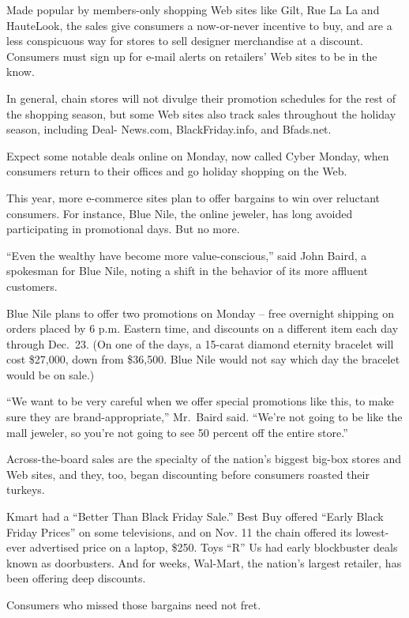 ﻿\documentclass[12pt]{article}
\begin{document}
Made popular by members-only shopping Web sites like Gilt, Rue La La and HauteLook, the sales give
consumers a now-or-never incentive to buy, and are a less conspicuous way for stores to sell
designer merchandise at a discount. Consumers must sign up for e-mail alerts on retailers' Web sites
to be in the know.

In general, chain stores will not divulge their promotion schedules for the rest of the shopping
season, but some Web sites also track sales throughout the holiday season, including Deal- News.com,
BlackFriday.info, and Bfads.net.

Expect some notable deals online on Monday, now called Cyber Monday, when consumers return to their
offices and go holiday shopping on the Web.

This year, more e-commerce sites plan to offer bargains to win over reluctant consumers. For
instance, Blue Nile, the online jeweler, has long avoided participating in promotional days. But no
more.

``Even the wealthy have become more value-conscious,'' said John Baird, a spokesman for Blue Nile,
noting a shift in the behavior of its more affluent customers.

Blue Nile plans to offer two promotions on Monday -- free overnight shipping on orders placed by 6
p.m. Eastern time, and discounts on a different item each day through Dec.~23. (On one of the days,
a 15-carat diamond eternity bracelet will cost \$27,000, down from \$36,500. Blue Nile would not say
which day the bracelet would be on sale.)

``We want to be very careful when we offer special promotions like this, to make sure they are
brand-appropriate,'' Mr.~Baird said. ``We're not going to be like the mall jeweler, so you're not
going to see 50 percent off the entire store.''

Across-the-board sales are the specialty of the nation's biggest big-box stores and Web sites, and
they, too, began discounting before consumers roasted their turkeys.

Kmart had a ``Better Than Black Friday Sale.'' Best Buy offered ``Early Black Friday Prices'' on
some televisions, and on Nov. 11 the chain offered its lowest-ever advertised price on a laptop,
\$250. Toys ``R'' Us had early blockbuster deals known as doorbusters. And for weeks, Wal-Mart, the
nation's largest retailer, has been offering deep discounts.

Consumers who missed those bargains need not fret.
\end{document}

